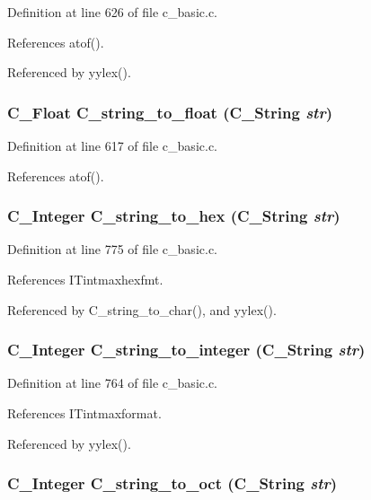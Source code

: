 Definition at line 626 of file c\_\-basic.c.

References atof().

Referenced by yylex().
\subsubsection{\setlength{\rightskip}{0pt plus 5cm}\bf{C\_\-Float} C\_\-string\_\-to\_\-float (\bf{C\_\-String} {\em str})}\label{c__basic_8c_1e26562297d5d2d8dfc6d064c0f4bb97}




Definition at line 617 of file c\_\-basic.c.

References atof().
\subsubsection{\setlength{\rightskip}{0pt plus 5cm}\bf{C\_\-Integer} C\_\-string\_\-to\_\-hex (\bf{C\_\-String} {\em str})}\label{c__basic_8c_cad7f70163dc04f98d91731fe502cfca}




Definition at line 775 of file c\_\-basic.c.

References ITintmaxhexfmt.

Referenced by C\_\-string\_\-to\_\-char(), and yylex().
\subsubsection{\setlength{\rightskip}{0pt plus 5cm}\bf{C\_\-Integer} C\_\-string\_\-to\_\-integer (\bf{C\_\-String} {\em str})}\label{c__basic_8c_2e16bcbe168d5f7c18ffe89ed3e70a6d}




Definition at line 764 of file c\_\-basic.c.

References ITintmaxformat.

Referenced by yylex().
\subsubsection{\setlength{\rightskip}{0pt plus 5cm}\bf{C\_\-Integer} C\_\-string\_\-to\_\-oct (\bf{C\_\-String} {\em str})}\label{c__basic_8c_8ecc0dc21731d12b5531491d2a5edbfc}




